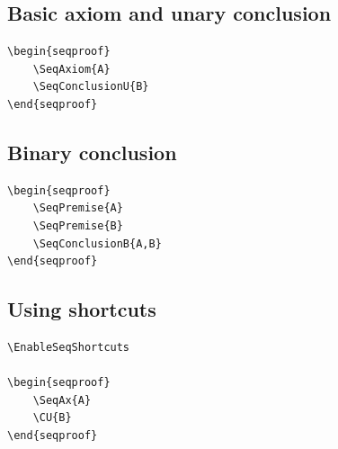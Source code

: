 \documentclass[a4paper,1pt]{article}
\begin{document}
\subsection{Basic axiom and unary conclusion}
\begin{tcolorbox}[seqexample,title={Axiom and unary inference}]
\begin{lstlisting}
\begin{seqproof}
    \SeqAxiom{A}
    \SeqConclusionU{B}
\end{seqproof}
\end{lstlisting}
\tcblower
\begin{seqproof}
\end{seqproof}
\end{tcolorbox}

\subsection{Binary conclusion}
\begin{tcolorbox}[seqexample,title={Binary conclusion}]
\begin{lstlisting}
\begin{seqproof}
    \SeqPremise{A}
    \SeqPremise{B}
    \SeqConclusionB{A,B}
\end{seqproof}
\end{lstlisting}
\tcblower
\begin{seqproof}
\end{seqproof}
\end{tcolorbox}

\subsection{Using shortcuts}
\begin{tcolorbox}[seqexample,title={Shortcuts enabled}]
\begin{lstlisting}
\EnableSeqShortcuts

\begin{seqproof}
    \SeqAx{A}
    \CU{B}
\end{seqproof}
\end{lstlisting}
\tcblower
\EnableSeqShortcuts
\begin{seqproof}
\end{seqproof}
\end{tcolorbox}
\end{document}
